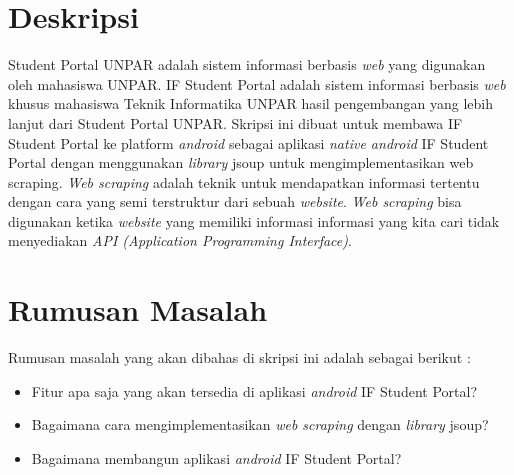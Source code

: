 \documentclass[a4paper,twoside]{article}
\begin{document}
\title{\@judultopik}
\author{\nama \textendash \@npm} 

\newcommand{\nama}{David Christopher}
\newcommand{\@npm}{2017730015}
\newcommand{\@judultopik}{IF Student Portal : Pemanfaatan \textit{Web Scraping} untuk Pembangunan Aplikasi \textit{Android}} %
\newcommand{\jumpemb}{1} %
\newcommand{\tanggal}{08/10/2020}


\maketitle


\section{Deskripsi}
Student Portal UNPAR adalah sistem informasi berbasis \textit{web} yang digunakan oleh mahasiswa UNPAR. IF Student Portal adalah sistem informasi berbasis \textit{web} khusus mahasiswa Teknik Informatika UNPAR hasil pengembangan yang lebih lanjut dari Student Portal UNPAR. Skripsi ini dibuat untuk membawa IF Student Portal ke platform \textit{android} sebagai aplikasi \textit{native android} IF Student Portal dengan menggunakan \textit{library} jsoup untuk mengimplementasikan web scraping. \textit{Web scraping} adalah teknik untuk mendapatkan informasi tertentu dengan cara yang semi terstruktur dari sebuah \textit{website}. \textit{Web scraping} bisa digunakan ketika \textit{website} yang memiliki informasi informasi yang kita cari tidak menyediakan \textit{API (Application Programming Interface)}. 

\section{Rumusan Masalah}
Rumusan masalah yang akan dibahas di skripsi ini adalah sebagai berikut :
\begin{itemize}
    \item Fitur apa saja yang akan tersedia di aplikasi \textit{android} IF Student Portal?
    \item Bagaimana cara mengimplementasikan \textit{web scraping} dengan \textit{library} jsoup?
    \item Bagaimana membangun aplikasi \textit{android} IF Student Portal?
    
\end{itemize}
\end{document}
